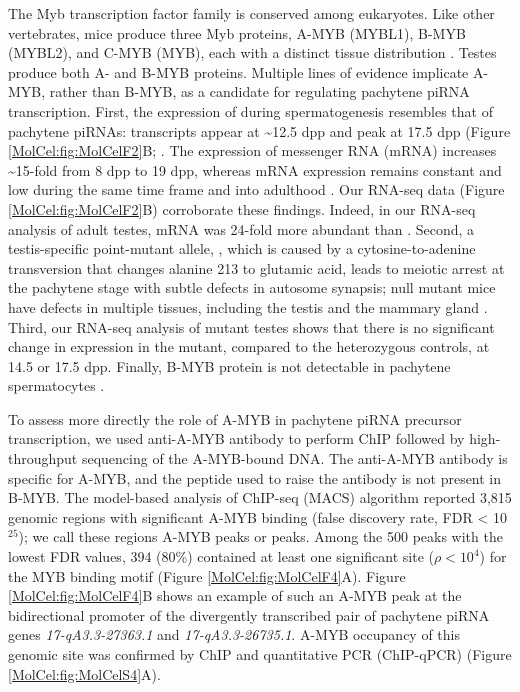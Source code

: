     The Myb transcription factor family is conserved among eukaryotes. Like other vertebrates, mice produce three Myb proteins, A-MYB (MYBL1), B-MYB (MYBL2), and C-MYB (MYB), each with a distinct tissue distribution \citep{Mettus1994, Trauth1994, Latham1996, Oh1999}. Testes produce both A- and B-MYB proteins. Multiple lines of evidence implicate A-MYB, rather than B-MYB, as a candidate for regulating pachytene piRNA transcription. First, the expression of \amyb{} during spermatogenesis resembles that of pachytene piRNAs: \amyb{} transcripts appear at \textasciitilde12.5 dpp and peak at 17.5 dpp (Figure \ref{MolCel:fig:MolCelF2}B; \citep{Bolcun-Filas2011}. The expression of \amyb{} messenger RNA (mRNA) increases \textasciitilde15-fold from 8 dpp to 19 dpp, whereas \bmyb{} mRNA expression remains constant and low during the same time frame and into adulthood \citep{Horvath2009}. Our RNA-seq data (Figure \ref{MolCel:fig:MolCelF2}B) corroborate these findings. Indeed, in our RNA-seq analysis of adult testes, \amyb{} mRNA was 24-fold more abundant than \bmyb{}. Second, a testis-specific \amyb{} point-mutant allele, \mybrepro, which is caused by a cytosine-to-adenine transversion that changes alanine 213 to glutamic acid, leads to meiotic arrest at the pachytene stage with subtle defects in autosome synapsis; \amyb{} null mutant mice have defects in multiple tissues, including the testis and the mammary gland \citep{Toscani1997, Bolcun-Filas2011}. Third, our RNA-seq analysis of \amyb{} mutant testes shows that there is no significant change in \bmyb{} expression in the mutant, compared to the heterozygous controls, at 14.5 or 17.5 dpp. Finally, B-MYB protein is not detectable in pachytene spermatocytes \citep{Horvath2009}.

    To assess more directly the role of A-MYB in pachytene piRNA precursor transcription, we used anti-A-MYB antibody to perform ChIP followed by high-throughput sequencing of the A-MYB-bound DNA. The anti-A-MYB antibody is specific for A-MYB, and the peptide used to raise the antibody is not present in B-MYB. The model-based analysis of ChIP-seq (MACS) algorithm \citep{Zhang2008} reported 3,815 genomic regions with significant A-MYB binding (false discovery rate, FDR < 10$^{25}$); we call these regions A-MYB peaks or peaks. Among the 500 peaks with the lowest FDR values, 394 (80\%) contained at least one significant site ($\rho < 10^{4}$) for the MYB binding motif (Figure \ref{MolCel:fig:MolCelF4}A). Figure \ref{MolCel:fig:MolCelF4}B shows an example of such an A-MYB peak at the bidirectional promoter of the divergently transcribed pair of pachytene piRNA genes \textit{17-qA3.3-27363.1} and \textit{17-qA3.3-26735.1}. A-MYB occupancy of this genomic site was confirmed by ChIP and quantitative PCR (ChIP-qPCR) (Figure \ref{MolCel:fig:MolCelS4}A).

